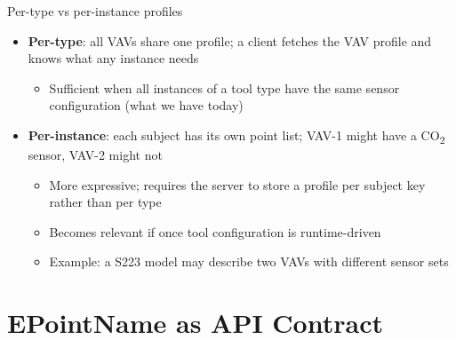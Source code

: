 \documentclass[aspectratio=169]{beamer}
\begin{document}
\begin{frame}{Per-type vs per-instance profiles}

\begin{itemize}
  \item \textbf{Per-type}: all VAVs share one profile; a client fetches the VAV profile and knows what any instance needs
    \begin{itemize}
      \item Sufficient when all instances of a tool type have the same sensor configuration (what we have today)
    \end{itemize}
  \item \textbf{Per-instance}: each subject has its own point list; VAV-1 might have a CO\textsubscript{2} sensor, VAV-2 might not
    \begin{itemize}
      \item More expressive; requires the server to store a profile per subject key rather than per type
      \item Becomes relevant if once tool configuration is runtime-driven
      \item Example: a S223 model may describe two VAVs with different sensor sets
    \end{itemize}
\end{itemize}

\end{frame}

\section{EPointName as API Contract}
\end{document}
